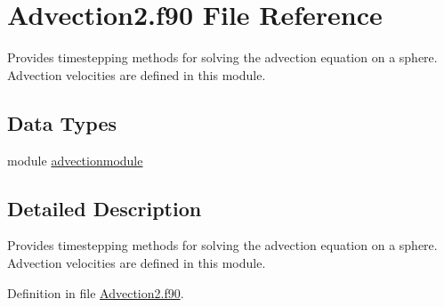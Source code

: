 \hypertarget{_advection2_8f90}{\section{Advection2.\+f90 File Reference}
\label{_advection2_8f90}
}


Provides timestepping methods for solving the advection equation on a sphere. Advection velocities are defined in this module.  


\subsection*{Data Types}
\begin{DoxyCompactItemize}
\item 
module \hyperlink{classadvectionmodule}{advectionmodule}
\end{DoxyCompactItemize}


\subsection{Detailed Description}
Provides timestepping methods for solving the advection equation on a sphere. Advection velocities are defined in this module. 



Definition in file \hyperlink{_advection2_8f90_source}{Advection2.\+f90}.

